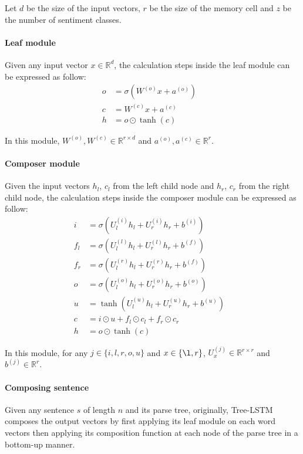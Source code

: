 Let \(d\) be the size of the input vectors, \(r
\) be the size of the memory cell and \(z\) be the number of sentiment classes. 

\paragraph{Leaf module}
Given any input vector \(x \in \mathbb{R}^d\), the calculation steps inside the leaf module can be expressed as follow:
\begin{align}
o &= \sigma{\left( W^{(o)} x + a^{\left(o\right)}\right)} & \\
c &= W^{(c)} x + a^{(c)} & \\
h &= o \odot \tanh{\left(c\right)} &
\end{align}

In this module, \(W^{(o)}, W^{(c)} \in \mathbb{R}^{r \times d}\) and \(a^{\left(o\right)}, a^{(c)} \in \mathbb{R}^r\).

\paragraph{Composer module}
Given the input vectors \({h_l}\), \({c_l}\) from the left child node and \({h_r}\), \({c_r}\) from the right child node, the calculation steps inside the composer module can be expressed as follow:
\begin{align}
i &= \sigma{ \left(U_l^{(i)} h_{l} + U_r^{(i)} h_{r} + b^{(i)} \right) } &\\
f_{l} &= \sigma{\left(U_{l}^{(l)} h_{l} + U_{r}^{(l)} h_{r} + b^{(f)}\right)} & \\
f_{r} &= \sigma{\left(U_{l}^{(r)} h_{l} + U_{r}^{(r)} h_{r} + b^{(f)}\right)} & \\
o &= \sigma{\left( U_l^{(o)} h_{l} + U_r^{(o)} h_{r} + b^{(o)}\right)} &\\
u &= \tanh{\left( U_l^{(u)} h_{l} + U_r^{(u)} h_{r} + b^{(u)}\right)} &\\
c &= i \odot u + f_{l} \odot c_{l} + f_{r} \odot c_{r} & \\
h &= o \odot \tanh{\left(c\right)} &
\end{align}

In this module, for any \(j \in \{i, l, r, o, u\}\) and \(x \in \{\l, r\}\), \(U_x^{(j)} \in \mathbb{R}^{r \times r}\) and \( b^{(j)} \in \mathbb{R}^r\).

\paragraph{Composing sentence}
Given any sentence \({s}\) of length \({n}\) and its parse tree, originally, Tree-LSTM composes the output vectors by first applying its leaf module on each word vectors then applying its composition function at each node of the parse tree in a bottom-up manner.
